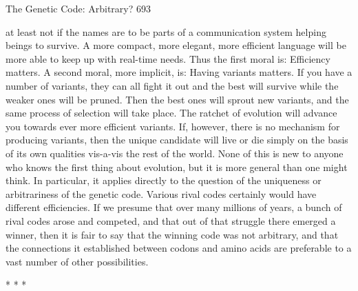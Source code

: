 The Genetic Code: Arbitrary?                                                           693

at least not if the names are to be parts of a communication system helping beings to
survive. A more compact, more elegant, more efficient language will be more able to
keep up with real-time needs. Thus the first moral is: Efficiency matters.
        A second moral, more implicit, is: Having variants matters. If you have a
number of variants, they can all fight it out and the best will survive while the weaker
ones will be pruned. Then the best ones will sprout new variants, and the same
process of selection will take place. The ratchet of evolution will advance you towards
ever more efficient variants. If, however, there is no mechanism for producing
variants, then the unique candidate will live or die simply on the basis of its own
qualities vis-a-vis the rest of the world.
        None of this is new to anyone who knows the first thing about evolution, but it
is more general than one might think. In particular, it applies directly to the question
of the uniqueness or arbitrariness of the genetic code. Various rival codes certainly
would have different efficiencies. If we presume that over many millions of years, a
bunch of rival codes arose and competed, and that out of that struggle there emerged a
winner, then it is fair to say that the winning code was not arbitrary, and that the
connections it established between codons and amino acids are preferable to a vast
number of other possibilities.

                                       *   *   *

